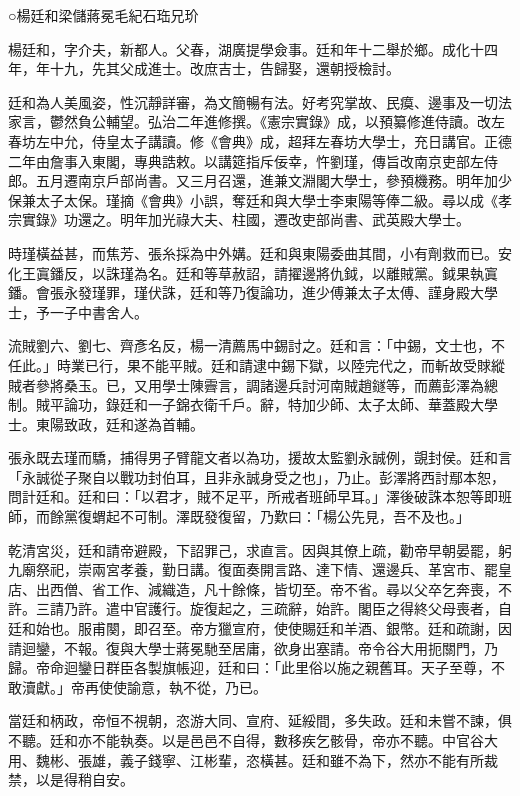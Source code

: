 
\begin{pinyinscope}
○楊廷和梁儲蔣冕毛紀石珤兄玠

楊廷和，字介夫，新都人。父春，湖廣提學僉事。廷和年十二舉於鄉。成化十四年，年十九，先其父成進士。改庶吉士，告歸娶，還朝授檢討。

廷和為人美風姿，性沉靜詳審，為文簡暢有法。好考究掌故、民瘼、邊事及一切法家言，鬱然負公輔望。弘治二年進修撰。《憲宗實錄》成，以預纂修進侍讀。改左春坊左中允，侍皇太子講讀。修《會典》成，超拜左春坊大學士，充日講官。正德二年由詹事入東閣，專典誥敕。以講筵指斥佞幸，忤劉瑾，傳旨改南京吏部左侍郎。五月遷南京戶部尚書。又三月召還，進兼文淵閣大學士，參預機務。明年加少保兼太子太保。瑾摘《會典》小誤，奪廷和與大學士李東陽等俸二級。尋以成《孝宗實錄》功還之。明年加光祿大夫、柱國，遷改吏部尚書、武英殿大學士。

時瑾橫益甚，而焦芳、張糸採為中外媾。廷和與東陽委曲其間，小有劑救而已。安化王寘鐇反，以誅瑾為名。廷和等草赦詔，請擢邊將仇鉞，以離賊黨。鉞果執寘鐇。會張永發瑾罪，瑾伏誅，廷和等乃復論功，進少傅兼太子太傅、謹身殿大學士，予一子中書舍人。

流賊劉六、劉七、齊彥名反，楊一清薦馬中錫討之。廷和言：「中錫，文士也，不任此。」時業已行，果不能平賊。廷和請逮中錫下獄，以陸完代之，而斬故受賕縱賊者參將桑玉。已，又用學士陳霽言，調諸邊兵討河南賊趙鐩等，而薦彭澤為總制。賊平論功，錄廷和一子錦衣衛千戶。辭，特加少師、太子太師、華蓋殿大學士。東陽致政，廷和遂為首輔。

張永既去瑾而驕，捕得男子臂龍文者以為功，援故太監劉永誠例，覬封侯。廷和言「永誠從子聚自以戰功封伯耳，且非永誠身受之也」，乃止。彭澤將西討鄢本恕，問計廷和。廷和曰：「以君才，賊不足平，所戒者班師早耳。」澤後破誅本恕等即班師，而餘黨復蝟起不可制。澤既發復留，乃歎曰：「楊公先見，吾不及也。」

乾清宮災，廷和請帝避殿，下詔罪己，求直言。因與其僚上疏，勸帝早朝晏罷，躬九廟祭祀，崇兩宮孝養，勤日講。復面奏開言路、達下情、還邊兵、革宮市、罷皇店、出西僧、省工作、減織造，凡十餘條，皆切至。帝不省。尋以父卒乞奔喪，不許。三請乃許。遣中官護行。旋復起之，三疏辭，始許。閣臣之得終父母喪者，自廷和始也。服甫闋，即召至。帝方獵宣府，使使賜廷和羊酒、銀幣。廷和疏謝，因請迴鑾，不報。復與大學士蔣冕馳至居庸，欲身出塞請。帝令谷大用扼關門，乃歸。帝命迴鑾日群臣各製旗帳迎，廷和曰：「此里俗以施之親舊耳。天子至尊，不敢瀆獻。」帝再使使諭意，執不從，乃已。

當廷和柄政，帝恒不視朝，恣游大同、宣府、延綏間，多失政。廷和未嘗不諫，俱不聽。廷和亦不能執奏。以是邑邑不自得，數移疾乞骸骨，帝亦不聽。中官谷大用、魏彬、張雄，義子錢寧、江彬輩，恣橫甚。廷和雖不為下，然亦不能有所裁禁，以是得稍自安。


\end{pinyinscope}
